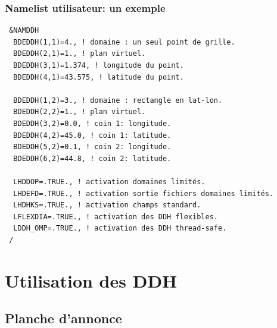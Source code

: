\documentclass[aspectratio=169]{beamer}
\begin{document}
\begin{frame}[fragile]
\frametitle{{\normalsize Namelist utilisateur: un exemple} }
\vspace*{-0.4cm}
\begin{exampleblock}{}
\begin{footnotesize}
\begin{verbatim} 
 &NAMDDH                                                                                            
  BDEDDH(1,1)=4., ! domaine : un seul point de grille.
  BDEDDH(2,1)=1., ! plan virtuel.
  BDEDDH(3,1)=1.374, ! longitude du point.
  BDEDDH(4,1)=43.575, ! latitude du point.

  BDEDDH(1,2)=3., ! domaine : rectangle en lat-lon.
  BDEDDH(2,2)=1., ! plan virtuel.
  BDEDDH(3,2)=0.0, ! coin 1: longitude.
  BDEDDH(4,2)=45.0, ! coin 1: latitude.
  BDEDDH(5,2)=0.1, ! coin 2: longitude.
  BDEDDH(6,2)=44.8, ! coin 2: latitude.

  LHDDOP=.TRUE., ! activation domaines limités.
  LHDEFD=.TRUE., ! activation sortie fichiers domaines limités.
  LHDHKS=.TRUE., ! activation champs standard.
  LFLEXDIA=.TRUE., ! activation des DDH flexibles.
  LDDH_OMP=.TRUE., ! activation des DDH thread-safe.
 /
\end{verbatim}  
\end{footnotesize}
\end{exampleblock}
\end{frame}
\section{Utilisation des DDH}

\subsection{Planche d'annonce}
\end{document}
